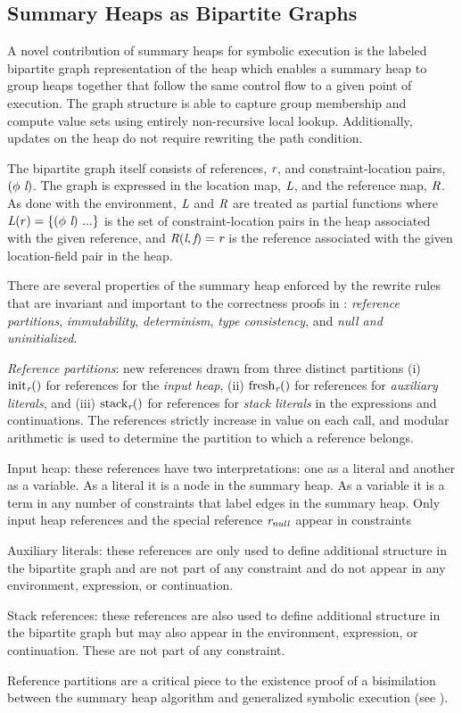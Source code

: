 \subsection{Summary Heaps as Bipartite Graphs}
A novel contribution of summary heaps for symbolic execution is the
labeled bipartite graph representation of the heap which enables a
summary heap to group heaps together that follow the same control flow
to a given point of execution. The graph structure is able to capture
group membership and compute value sets using entirely non-recursive
local lookup. Additionally, updates on the heap do not require
rewriting the path condition.

The bipartite graph itself consists of references, $\emph{r}$, and
constraint-location pairs, $(\phi\ \emph{l})$. The graph is
expressed in the location map, $\emph{L}$, and the reference map,
$\emph{R}$. As done with the environment, $\emph{L}$ and $\emph{R}$
are treated as partial functions where $\emph{L}(r) =
\{(\phi\ \emph{l})\ ...\}$ is the set of constraint-location pairs in
the heap associated with the given reference, and
$\emph{R}(\emph{l},\emph{f}) = \emph{r}$ is the reference
associated with the given location-field pair in the heap.  

There are several properties of the summary heap enforced by the
rewrite rules that are invariant and important to the correctness
proofs in : \emph{reference partitions},
\emph{immutability}, \emph{determinism}, \emph{type
  consistency}, and \emph{null and uninitialized}.

\emph{Reference partitions}: new references drawn from
  three distinct partitions (i) $\mathrm{init}_{\emph{r}}()$ for references for the \emph{input heap}, (ii) $\mathrm{fresh}_{\emph{r}}()$ for references for \emph{auxiliary literals}, and
  (iii) $\mathrm{stack}_{\emph{r}}()$ for references for \emph{stack literals} in the expressions and
  continuations. The references strictly increase in value on each
  call, and modular arithmetic is used to determine the partition to
  which a reference belongs.
\begin{compactdesc}
\item[Input heap:] these references have two
  interpretations: one as a literal and another as a variable. As a literal it is a node in
  the summary heap. As a variable it is a term in any number of constraints that label
  edges in the summary heap. Only input heap references and the
  special reference $\emph{r}_\mathit{null}$ appear in constraints
\item[Auxiliary literals:] these references are only used to define additional structure in
  the bipartite graph and are not part of any constraint and do not appear
  in any environment, expression, or continuation.
\item[Stack references:] these references are also used to define additional structure in the bipartite graph but may also appear in the environment, expression, or continuation. These are not part of any constraint.
\end{compactdesc}
Reference partitions are a critical piece to the existence proof of a
bisimilation between the summary heap algorithm and generalized
symbolic execution (see ).

